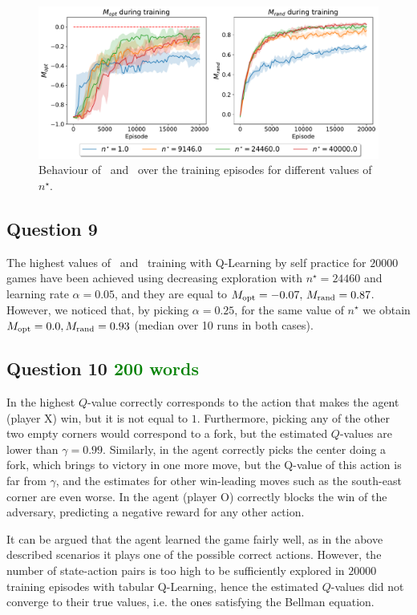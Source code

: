 \documentclass[10pt]{IEEEtran}
\begin{document}
\begin{figure}[h]
    \centering
    \includegraphics[width=\linewidth]{code/figures/performance_n_star_self.pdf}
    \caption{Behaviour of \mopt\ and \mrand\ over the training episodes for different values of $n^{\star}$.}
    \label{plot_question8}
\end{figure}

\subsection*{Question 9}
The highest values of \mopt\  and \mrand\  training with Q-Learning by self practice for $20000$ games have been achieved using decreasing exploration with $n^{\star} = 24460$ and learning rate $\alpha = 0.05$, and they are equal to $M_{\text{opt}} = -0.07, \, M_{\text{rand}} = 0.87$. However, we noticed that, by picking $\alpha = 0.25$, for the same value of $n^{\star}$ we obtain $M_{\text{opt}} = 0.0, M_{\text{rand}} = 0.93$ (median over 10 runs in both cases).

\subsection*{Question 10  \textcolor{green}{200 words}}
In  the highest $Q$-value correctly corresponds to the action that makes the agent (player X) win, but it is not equal to $1$. Furthermore, picking any of the other two empty corners would correspond to a fork, but the estimated $Q$-values are lower than $\gamma = 0.99$. Similarly, in  the agent correctly picks the center doing a fork, which brings to victory in one more move, but the Q-value of this action is far from $\gamma$, and the estimates for other win-leading moves such as the south-east corner are even worse. In  the agent (player O) correctly blocks the win of the adversary, predicting a negative reward for any other action.

It can be argued that the agent learned the game fairly well, as in the above described scenarios it plays one of the possible correct actions. However, the number of state-action pairs is too high to be sufficiently explored in $20000$ training episodes with tabular Q-Learning, hence the estimated $Q$-values did not converge to their true values, i.e. the ones satisfying the Bellman equation. 
\end{document}
